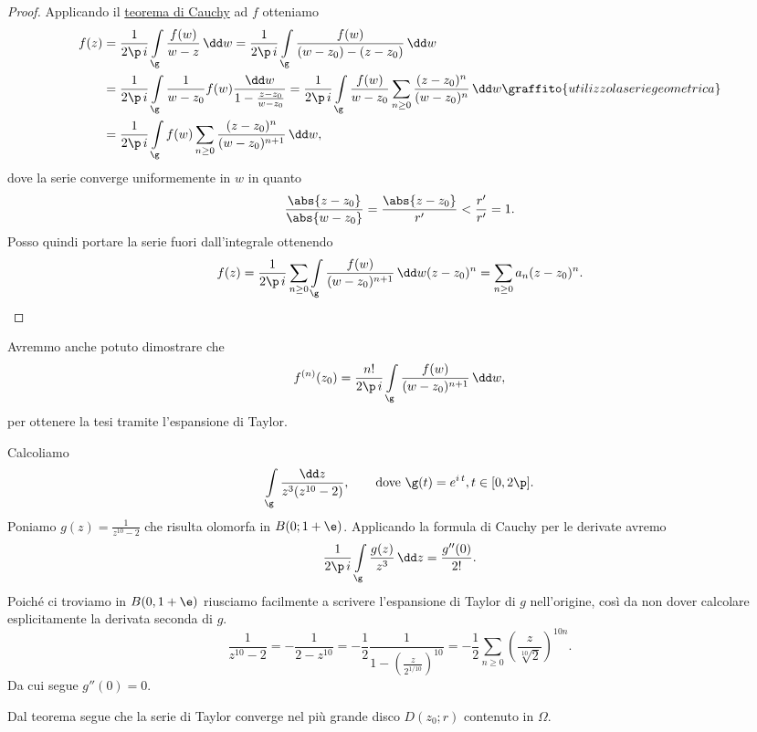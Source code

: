 \begin{proof}
	Applicando il \hyperref[th:teorCauchyRettangoli]{teorema di Cauchy} ad \(f\) otteniamo
	\[
		\begin{split}
			f(z) & = \frac{1}{2\p\,i} \int\limits_\g \frac{f(w)}{w-z}\,\dd w = \frac{1}{2\p\,i} \int\limits_\g \frac{f(w)}{(w-z_0)-(z-z_0)}\,\dd w\\
			& = \frac{1}{2\p\,i} \int\limits_\g \frac{1}{w-z_0}f(w) \frac{\dd w}{1- \frac{z-z_0}{w-z_0}} = \frac{1}{2\p\,i} \int\limits_\g \frac{f(w)}{w-z_0} \sum_{n\ge 0} \frac{(z-z_0)^n}{(w-z_0)^n}\,\dd w\graffito{utilizzo la serie geometrica}\\
			& = \frac{1}{2\p\,i} \int\limits_\g f(w) \sum_{n\ge 0}\frac{(z-z_0)^n}{(w-z_0)^{n+1}}\,\dd w,
		\end{split}
	\]
	dove la serie converge uniformemente in \(w\) in quanto
	\[
		\frac{\abs{z-z_0}}{\abs{w-z_0}} = \frac{\abs{z-z_0}}{r'} < \frac{r'}{r'} = 1.
	\]
	Posso quindi portare la serie fuori dall'integrale ottenendo
	\[
		f(z) = \frac{1}{2\p\,i} \sum_{n\ge 0} \int\limits_\g \frac{f(w)}{(w-z_0)^{n+1}}\,\dd w (z-z_0)^n = \sum_{n\ge 0}a_n (z-z_0)^n.\qedhere
	\]
\end{proof}

\begin{oss}
	Avremmo anche potuto dimostrare che
	\[
		f^{(n)}(z_0) = \frac{n!}{2\p\,i} \int\limits_\g \frac{f(w)}{(w-z_0)^{n+1}}\,\dd w,
	\]
	per ottenere la tesi tramite l'espansione di Taylor.
\end{oss}

\begin{ese}
	Calcoliamo
	\[
		\int\limits_\g \frac{\dd z}{z^3(z^{10}-2)}, \qquad\text{dove }\g(t)=e^{i\,t}, t\in[0,2\p].
	\]
	Poniamo \(g(z)=\frac{1}{z^{10}-2}\) che risulta olomorfa in \(B(0;1+\e)\). Applicando la formula di Cauchy per le derivate avremo
	\[
		\frac{1}{2\p\,i} \int\limits_\g \frac{g(z)}{z^3}\,\dd z = \frac{g''(0)}{2!}.
	\]
	Poiché ci troviamo in \(B(0,1+\e)\) riusciamo facilmente a scrivere l'espansione di Taylor di \(g\) nell'origine, così da non dover calcolare esplicitamente la derivata seconda di \(g\).
	\[
		\frac{1}{z^{10}-2} = -\frac{1}{2-z^{10}} = -\frac{1}{2} \frac{1}{1- \left( \frac{z}{2^{1/10}} \right)^{10}} = -\frac{1}{2}\sum_{n\ge 0} \left( \frac{z}{\sqrt[10]{2}} \right)^{10 n}.
	\]
	Da cui segue \(g''(0)=0\).
\end{ese}

\begin{oss}
	Dal teorema segue che la serie di Taylor converge nel più grande disco \(D(z_0;r)\) contenuto in \(\Omega\).
\end{oss}

